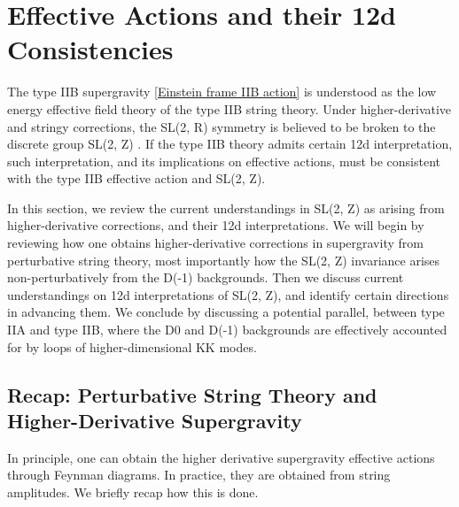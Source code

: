 \section{Effective Actions and their 12d Consistencies}
The type IIB supergravity \eqref{Einstein frame IIB action} is understood as the low energy effective field theory of the type IIB string theory.
Under higher-derivative and stringy corrections, the SL(2, R) symmetry is believed to be broken to the discrete group SL(2, Z) \cite{Schwarz:1995dk}.
If the type IIB theory admits certain 12d interpretation, such interpretation, and its implications on effective actions, must be consistent with the type IIB effective action and SL(2, Z).

In this section, we review the current understandings in SL(2, Z) as arising from higher-derivative corrections, and their 12d interpretations.
We will begin by reviewing how one obtains higher-derivative corrections in supergravity from perturbative string theory, most importantly how the SL(2, Z) invariance arises non-perturbatively from the D(-1) backgrounds.
Then we discuss current understandings on 12d interpretations of SL(2, Z), and identify certain directions in advancing them. 
We conclude by discussing a potential parallel, between type IIA and type IIB, where the D0 and D(-1) backgrounds are effectively accounted for by loops of higher-dimensional KK modes.

\subsection{Recap: Perturbative String Theory and Higher-Derivative Supergravity}
In principle, one can obtain the higher derivative supergravity effective actions through Feynman diagrams.
In practice, they are obtained from string amplitudes. 
We briefly recap how this is done.

